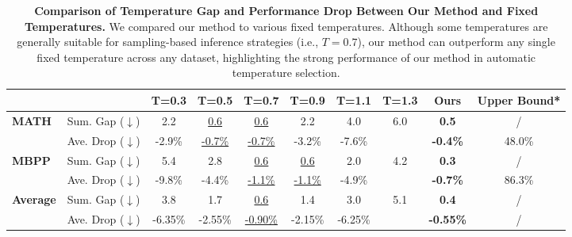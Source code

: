 \begin{table*}[t]
\centering
\caption{\textbf{Comparison of Temperature Gap and Performance Drop Between Our Method and Fixed Temperatures.} We compared our method to various fixed temperatures. Although some temperatures are generally suitable for sampling-based inference strategies (i.e., $T=0.7$), our method can outperform any single fixed temperature across any dataset, highlighting the strong performance of our method in automatic temperature selection.}
\label{tab:temperature_comparison}
\begin{tabular}{l|l|cccccc|c|c}
\toprule
 & & \textbf{T=0.3} & \textbf{T=0.5} & \textbf{T=0.7} & \textbf{T=0.9} & \textbf{T=1.1} & \textbf{T=1.3} & \textbf{Ours} & \textbf{Upper Bound*}\\
\hline
\multirow{2}{*}{\textbf{MATH}} 
  & Sum. Gap ($\downarrow$) & 2.2 & \underline{0.6} & \underline{0.6} & 2.2 & 4.0 & 6.0 & \textbf{0.5} & / \\
  & Ave. Drop ($\downarrow$) & -2.9\% & \underline{-0.7\%} & \underline{-0.7\%} & -3.2\% & -7.6\% &  & \textbf{-0.4\%} & 48.0\% \\
\hline
\multirow{2}{*}{\textbf{MBPP}} 
  & Sum. Gap ($\downarrow$) & 5.4 & 2.8 & \underline{0.6} & \underline{0.6} & 2.0 & 4.2 & \textbf{0.3} & / \\
  & Ave. Drop ($\downarrow$) & -9.8\% & -4.4\% & \underline{-1.1\%} & \underline{-1.1\%} & -4.9\% &  & \textbf{-0.7\%} & 86.3\% \\
\hline
\multirow{2}{*}{\textbf{Average}} 
  & Sum. Gap ($\downarrow$) & 3.8 & 1.7 & \underline{0.6} & 1.4 & 3.0 & 5.1 & \textbf{0.4} & / \\
  & Ave. Drop ($\downarrow$) & -6.35\% & -2.55\% & \underline{-0.90\%} & -2.15\% & -6.25\% &  & \textbf{-0.55\%} & / \\
\bottomrule
\end{tabular}
\end{table*}
